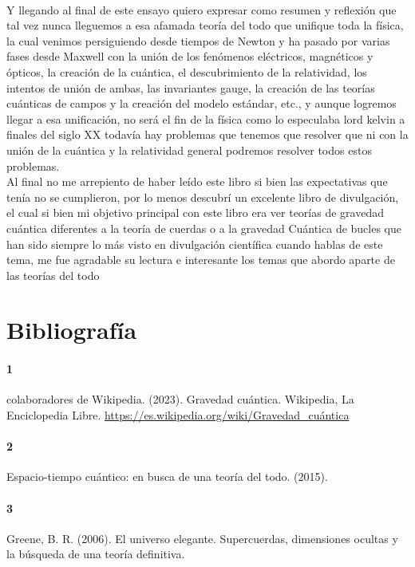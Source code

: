 \documentclass[12pt]{article}
\begin{document}
\paragraph*{}
\textsf{Y llegando al final de este ensayo quiero expresar como resumen y reflexión que tal vez nunca lleguemos a esa afamada teoría del todo 
que unifique toda la física, la cual venimos persiguiendo desde tiempos de Newton y ha pasado por varias fases desde Maxwell
con la unión de los fenómenos eléctricos, magnéticos y ópticos, la creación de la cuántica, el descubrimiento de la
relatividad, los intentos de unión de ambas, las invariantes gauge, la creación de las teorías cuánticas de campos
y la creación del modelo estándar, etc., y aunque logremos llegar a esa unificación, no será el fin de la física como 
lo especulaba lord kelvin a finales del siglo XX todavía hay problemas que tenemos que resolver que ni con la unión 
de la cuántica y la relatividad general podremos resolver todos estos problemas.\\ Al final no me arrepiento de haber leído 
este libro si bien las expectativas que tenía no se cumplieron, por lo menos descubrí un excelente libro de divulgación, el cual 
si bien mi objetivo principal con este libro era ver teorías de gravedad cuántica diferentes a la teoría de cuerdas o a la gravedad
Cuántica de bucles que han sido siempre lo más visto en divulgación científica cuando hablas de este tema, me fue agradable su lectura
e interesante los temas que abordo aparte de las teorías del todo}
\newpage
\section*{Bibliografía}
\paragraph*{1}
\textsf{colaboradores de Wikipedia. (2023). Gravedad cuántica. Wikipedia, La Enciclopedia Libre.}
\url{https://es.wikipedia.org/wiki/Gravedad_cuántica}
\paragraph*{2}
\textsf{Espacio-tiempo cuántico: en busca de una teoría del todo. (2015).
}
\paragraph*{3}
\textsf{Greene, B. R. (2006). El universo elegante. Supercuerdas, dimensiones ocultas y la búsqueda de una teoría definitiva.}
\end{document}
